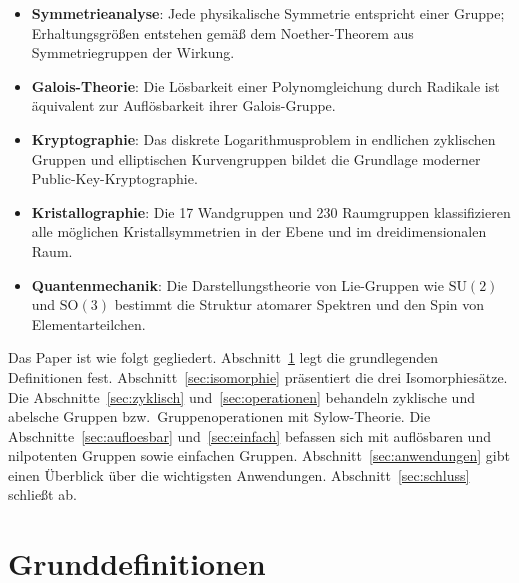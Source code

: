\documentclass[12pt,a4paper]{amsart}
\theoremstyle{definition}
\begin{document}
\begin{itemize}[leftmargin=2em]
  \item \textbf{Symmetrieanalyse}: Jede physikalische Symmetrie entspricht einer Gruppe;
        Erhaltungsgrößen entstehen gemäß dem Noether-Theorem aus Symmetriegruppen der
        Wirkung.
  \item \textbf{Galois-Theorie}: Die Lösbarkeit einer Polynomgleichung durch Radikale ist
        äquivalent zur Auflösbarkeit ihrer Galois-Gruppe.
  \item \textbf{Kryptographie}: Das diskrete Logarithmusproblem in endlichen zyklischen
        Gruppen und elliptischen Kurvengruppen bildet die Grundlage moderner
        Public-Key-Kryptographie.
  \item \textbf{Kristallographie}: Die 17 Wandgruppen und 230 Raumgruppen klassifizieren
        alle möglichen Kristallsymmetrien in der Ebene und im dreidimensionalen Raum.
  \item \textbf{Quantenmechanik}: Die Darstellungstheorie von Lie-Gruppen wie
        $\mathrm{SU}(2)$ und $\mathrm{SO}(3)$ bestimmt die Struktur atomarer Spektren
        und den Spin von Elementarteilchen.
\end{itemize}

Das Paper ist wie folgt gegliedert. Abschnitt~\ref{sec:definitionen} legt die grundlegenden
Definitionen fest. Abschnitt~\ref{sec:isomorphie} präsentiert die drei Isomorphiesätze.
Die Abschnitte~\ref{sec:zyklisch} und~\ref{sec:operationen} behandeln zyklische und abelsche
Gruppen bzw.\ Gruppenoperationen mit Sylow-Theorie. Die
Abschnitte~\ref{sec:aufloesbar} und~\ref{sec:einfach} befassen sich mit auflösbaren und
nilpotenten Gruppen sowie einfachen Gruppen. Abschnitt~\ref{sec:anwendungen} gibt einen
Überblick über die wichtigsten Anwendungen. Abschnitt~\ref{sec:schluss} schließt ab.

\section{Grunddefinitionen}
\label{sec:definitionen}
\end{document}

